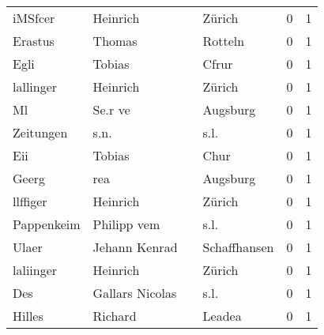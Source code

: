 \begin{tabular}{llllrr}
                  iMSfcer &                           Heinrich &             &                                      Zürich &          0 &         1 \\
                  Erastus &                             Thomas &             &                                     Rotteln &          0 &         1 \\
                     Egli &                             Tobias &             &                                       Cfrur &          0 &         1 \\
                lallinger &                           Heinrich &             &                                      Zürich &          0 &         1 \\
                       Ml &                            Se.r ve &             &                                    Augsburg &          0 &         1 \\
                Zeitungen &                               s.n. &             &                                        s.l. &          0 &         1 \\
                      Eii &                             Tobias &             &                                        Chur &          0 &         1 \\
                    Geerg &                                rea &             &                                    Augsburg &          0 &         1 \\
                 llffiger &                           Heinrich &             &                                      Zürich &          0 &         1 \\
               Pappenkeim &                        Philipp vem &             &                                        s.l. &          0 &         1 \\
                    Ulaer &                      Jehann Kenrad &             &                                Schaffhansen &          0 &         1 \\
                laliinger &                           Heinrich &             &                                      Zürich &          0 &         1 \\
                      Des &                    Gallars Nicolas &             &                                        s.l. &          0 &         1 \\
                   Hilles &                            Richard &             &                                      Leadea &          0 &         1 \\

\end{tabular}
